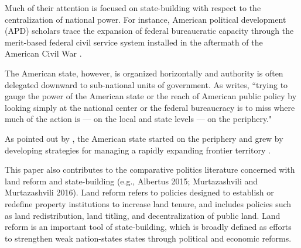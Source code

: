 Much of their attention is focused on state-building with respect to the centralization of national power. For instance, American political development (APD) scholars trace the expansion of federal bureaucratic capacity through the merit-based federal civil service system installed in the aftermath of the American Civil War \citep{skowronek1982building,bensel1990,carpenter2001}. 

The American state, however, is organized horizontally and authority is often delegated downward to sub-national units of government. As \citet{novak2008myth} writes, ``trying to gauge the power of the American state or the reach of American public policy by looking simply at the national center or the federal bureaucracy is to miss where much of the action is --- on the local and state levels --- on the periphery."

As pointed out by \citet{greene1986peripheries}, the American state started on the periphery and grew by developing strategies for managing a rapidly expanding frontier territory .

This paper also contributes to the comparative politics literature concerned with land reform and state-building (e.g., Albertus 2015; Murtazashvili and Murtazashvili 2016). Land reform refers to policies designed to establish or redefine property institutions to increase land tenure, and includes policies such as land redistribution, land titling, and decentralization of public land. Land reform is an important tool of state-building, which is broadly defined as efforts to strengthen weak nation-states states through political and economic reforms.


